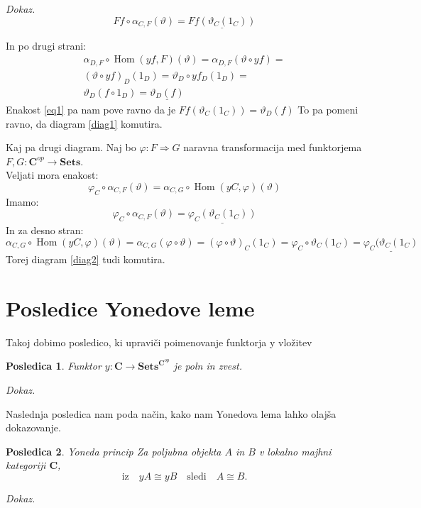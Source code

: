 \documentclass[12pt,a4paper]{book}
\theoremstyle{definition}
\theoremstyle{plain}
\newtheorem{posledica}{Posledica}
\newenvironment{dokaz}{\emph{Dokaz.}\ }{\hspace{\fill}{$\Box$}}
\theoremstyle{definition}
\theoremstyle{remark}
\newcommand{\cat}[1]{\textbf{#1}}
\DeclareMathOperator{\Hom}{Hom}
\begin{document}
\begin{dokaz}
$$Ff \circ \alpha_{C,F}(\vartheta) = \underline{Ff(\vartheta_C(1_C))}$$

In po drugi strani:
\begin{align*}
\alpha_{D,F} \circ \Hom(yf,F)(\vartheta) = \alpha_{D,F}(\vartheta \circ yf) = \\
(\vartheta \circ yf)_D (1_D) = \vartheta_D \circ yf_D(1_D) = \\
\vartheta_D(f \circ 1_D) = \underline{\vartheta_D(f)}
\end{align*}
Enakost \ref{eq1} pa nam pove ravno da je $Ff(\vartheta_C(1_C)) = \vartheta_D(f)$
To pa pomeni ravno, da diagram \ref{diag1} komutira.

Kaj pa drugi diagram. Naj bo $\varphi : F \Rightarrow G$ naravna transformacija med funktorjema $F,G : \cat{C}^{op} \to \cat{Sets}$. \\
Veljati mora enakost:
$$\varphi_C \circ \alpha_{C,F}(\vartheta) = \alpha_{C,G} \circ \Hom(yC,\varphi)(\vartheta)$$
Imamo:
$$\varphi_C \circ \alpha_{C,F}(\vartheta) = \underline{\varphi_C(\vartheta_C(1_C))}$$
In za desno stran:
$$\alpha_{C,G} \circ \Hom(yC,\varphi)(\vartheta) = \alpha_{C,G}(\varphi \circ \vartheta) = 
(\varphi \circ \vartheta)_C(1_C) = \varphi_C \circ \vartheta_C(1_C) = \underline{\varphi_C(\vartheta_C(1_C)}$$
Torej diagram \ref{diag2} tudi komutira.

\end{dokaz}

\section{Posledice Yonedove leme}

Takoj dobimo posledico, ki upraviči poimenovanje funktorja y vložitev
\begin{posledica} Funktor $y : \cat{C} \to \cat{Sets}^{\cat{C}^{op}}$ je poln in zvest.
\end{posledica}
\begin{dokaz}

\end{dokaz}

Naslednja posledica nam poda način, kako nam Yonedova lema lahko olajša dokazovanje.

\begin{posledica} \emph{Yoneda princip}
Za poljubna objekta $A$ in $B$ v lokalno majhni kategoriji $\cat{C}$,
$$\text{iz} \quad yA \cong yB \quad\text{sledi}\quad A \cong B .$$
\end{posledica}
\begin{dokaz}

\end{dokaz}
\end{document}
